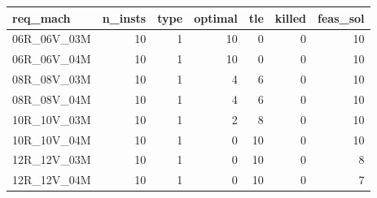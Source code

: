 
\begin{tabular}{lrrrrrr}
\toprule
req\_mach & n\_insts & type & optimal & tle & killed & feas\_sol\\
\midrule
06R\_06V\_03M & 10 & 1 & 10 & 0 & 0 & 10\\
06R\_06V\_04M & 10 & 1 & 10 & 0 & 0 & 10\\
08R\_08V\_03M & 10 & 1 & 4 & 6 & 0 & 10\\
08R\_08V\_04M & 10 & 1 & 4 & 6 & 0 & 10\\
10R\_10V\_03M & 10 & 1 & 2 & 8 & 0 & 10\\
\addlinespace
10R\_10V\_04M & 10 & 1 & 0 & 10 & 0 & 10\\
12R\_12V\_03M & 10 & 1 & 0 & 10 & 0 & 8\\
12R\_12V\_04M & 10 & 1 & 0 & 10 & 0 & 7\\
\bottomrule
\end{tabular}

